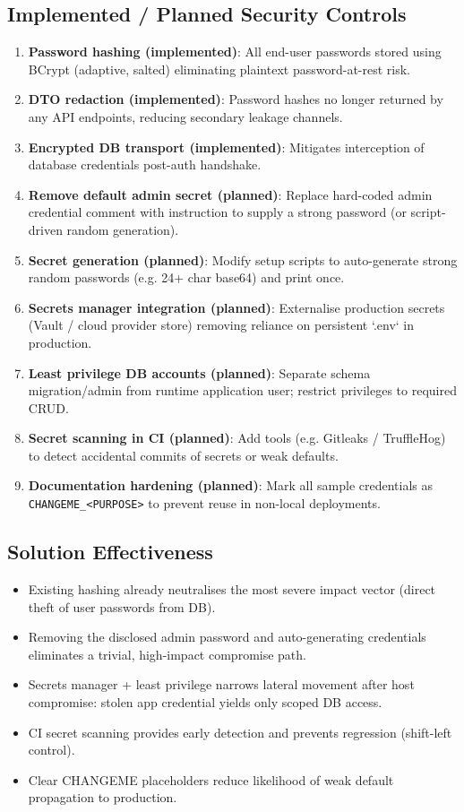 \documentclass[]{UCD_CS_FYP_Report}
\begin{document}
\subsection*{Implemented / Planned Security Controls}
\begin{enumerate}
	\item \textbf{Password hashing (implemented)}: All end-user passwords stored using BCrypt (adaptive, salted) eliminating plaintext password-at-rest risk.
	\item \textbf{DTO redaction (implemented)}: Password hashes no longer returned by any API endpoints, reducing secondary leakage channels.
	\item \textbf{Encrypted DB transport (implemented)}: Mitigates interception of database credentials post-auth handshake.
	\item \textbf{Remove default admin secret (planned)}: Replace hard-coded admin credential comment with instruction to supply a strong password (or script-driven random generation).
	\item \textbf{Secret generation (planned)}: Modify setup scripts to auto-generate strong random passwords (e.g. 24+ char base64) and print once.
	\item \textbf{Secrets manager integration (planned)}: Externalise production secrets (Vault / cloud provider store) removing reliance on persistent `.env` in production.
	\item \textbf{Least privilege DB accounts (planned)}: Separate schema migration/admin from runtime application user; restrict privileges to required CRUD.
	\item \textbf{Secret scanning in CI (planned)}: Add tools (e.g. Gitleaks / TruffleHog) to detect accidental commits of secrets or weak defaults.
		\item \textbf{Documentation hardening (planned)}: Mark all sample credentials as \texttt{CHANGEME\_<PURPOSE>} to prevent reuse in non-local deployments.
\end{enumerate}

\subsection*{Solution Effectiveness}
\begin{itemize}
	\item Existing hashing already neutralises the most severe impact vector (direct theft of user passwords from DB).
	\item Removing the disclosed admin password and auto-generating credentials eliminates a trivial, high-impact compromise path.
	\item Secrets manager + least privilege narrows lateral movement after host compromise: stolen app credential yields only scoped DB access.
	\item CI secret scanning provides early detection and prevents regression (shift-left control).
	\item Clear CHANGEME placeholders reduce likelihood of weak default propagation to production.
\end{itemize}
\end{document}
